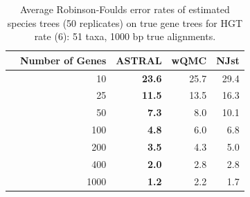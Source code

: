 \begin{table}[h!]
\begin{tabular}{rrrrr}
 & Number of Genes & ASTRAL & wQMC   & NJst\\
\hline
 & 10 & \textbf{23.6} & 25.7   & 29.4\\
 & 25 & \textbf{11.5} & 13.5   & 16.3\\
 & 50 & \textbf{7.3} & 8.0 &   10.1\\
 & 100 & \textbf{4.8} & 6.0 &   6.8\\
 & 200 & \textbf{3.5} & 4.3 &   5.0\\
 & 400 & \textbf{2.0} & 2.8 &   2.8\\
 & 1000 & \textbf{1.2} & 2.2 &   1.7\\
\end{tabular}
\caption[Error rates of estimated species trees (50 replicates)  on true gene trees for HGT rate 6]{Average Robinson-Foulds error rates of estimated
species  trees (50 replicates) on true gene trees for HGT rate 
(6): 51 taxa, 1000 bp true alignments. }

\label{hgt::table12}
\end{table}


